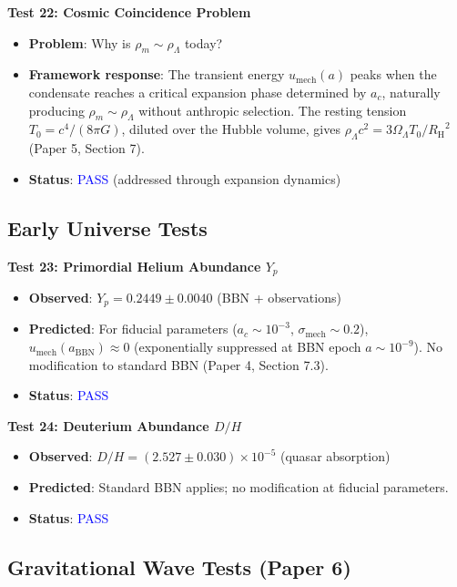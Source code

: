 \documentclass[11pt,a4paper]{article}
\newcommand{\Tzero}{\ensuremath{T_0}}
\newcommand{\RH}{\ensuremath{R_{\mathrm{H}}}}
\newcommand{\umech}{\ensuremath{u_{\mathrm{mech}}}}
\theoremstyle{definition}
\theoremstyle{remark}
\begin{document}
\textbf{Test 22: Cosmic Coincidence Problem}

\begin{itemize}[leftmargin=*, itemsep=0.1em]
\item \textbf{Problem}: Why is $\rho_m \sim \rho_\Lambda$ today?
\item \textbf{Framework response}: The transient energy $\umech(a)$ peaks when the condensate reaches a critical expansion phase determined by $a_c$, naturally producing $\rho_m \sim \rho_\Lambda$ without anthropic selection. The resting tension $\Tzero = c^4/(8\pi G)$, diluted over the Hubble volume, gives $\rho_\Lambda c^2 = 3\Omega_\Lambda \Tzero/\RH^2$ (Paper 5, Section 7).
\item \textbf{Status}: \textcolor{blue}{PASS} (addressed through expansion dynamics)
\end{itemize}

\subsection{Early Universe Tests}
\label{sec:tests_early}

\textbf{Test 23: Primordial Helium Abundance $Y_p$}

\begin{itemize}[leftmargin=*, itemsep=0.1em]
\item \textbf{Observed}: $Y_p = 0.2449 \pm 0.0040$ (BBN + observations) \cite{Aver2015}
\item \textbf{Predicted}: For fiducial parameters ($a_c \sim 10^{-3}$, $\sigma_{\mathrm{mech}} \sim 0.2$), $\umech(a_{\mathrm{BBN}}) \approx 0$ (exponentially suppressed at BBN epoch $a \sim 10^{-9}$). No modification to standard BBN (Paper 4, Section 7.3).
\item \textbf{Status}: \textcolor{blue}{PASS}
\end{itemize}

\textbf{Test 24: Deuterium Abundance $D/H$}

\begin{itemize}[leftmargin=*, itemsep=0.1em]
\item \textbf{Observed}: $D/H = (2.527 \pm 0.030) \times 10^{-5}$ (quasar absorption) \cite{Cooke2018}
\item \textbf{Predicted}: Standard BBN applies; no modification at fiducial parameters.
\item \textbf{Status}: \textcolor{blue}{PASS}
\end{itemize}

\subsection{Gravitational Wave Tests (Paper 6)}
\label{sec:tests_gw}
\end{document}
